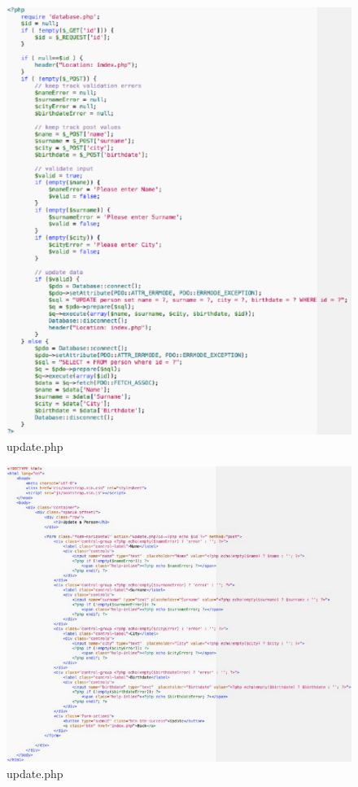 \begin{itemize}
\begin{center}
\begin{figure}[H]
\centering
\includegraphics[scale=1]{figures/updatephp.png}
\caption{update.php} 
\end{figure}
\end{center}

\begin{center}
\begin{figure}[H]
\centering
\includegraphics[scale=0.8]{figures/updatephp2.png}
\caption{update.php} 
\end{figure}
\end{center}


\end{itemize}
